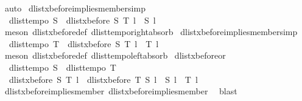 \begin{isabellebody}
\ auto%
\endisatagproof
{\isafoldproof}%
%
\isadelimproof
\isanewline
%
\endisadelimproof
\isanewline
{}\isamarkupfalse%
\ dlist{\isacharunderscore}xbefore{\isacharunderscore}implies{\isacharunderscore}member{}{\isacharbrackleft}simp{\isacharbrackright}{\isacharcolon}\ \isanewline
\ \ {\isachardoublequoteopen}dlist{\isacharunderscore}tempo{}\ S\ {\isasymLongrightarrow}\ dlist{\isacharunderscore}xbefore\ S\ T\ l\ {\isasymLongrightarrow}\ S\ l{\isachardoublequoteclose}\isanewline
%
\isadelimproof
%
\endisadelimproof
%
\isatagproof
{}\isamarkupfalse%
\ {\isacharparenleft}meson\ dlist{\isacharunderscore}xbefore{\isacharunderscore}def\ dlist{\isacharunderscore}tempo{}{\isacharunderscore}right{\isacharunderscore}absorb{\isacharparenright}%
\endisatagproof
{\isafoldproof}%
%
\isadelimproof
\isanewline
%
\endisadelimproof
\isanewline
{}\isamarkupfalse%
\ dlist{\isacharunderscore}xbefore{\isacharunderscore}implies{\isacharunderscore}member{}{\isacharbrackleft}simp{\isacharbrackright}{\isacharcolon}\ \isanewline
\ \ {\isachardoublequoteopen}dlist{\isacharunderscore}tempo{}\ T\ {\isasymLongrightarrow}\ dlist{\isacharunderscore}xbefore\ S\ T\ l\ {\isasymLongrightarrow}\ T\ l{\isachardoublequoteclose}\isanewline
%
\isadelimproof
%
\endisadelimproof
%
\isatagproof
{}\isamarkupfalse%
\ {\isacharparenleft}meson\ dlist{\isacharunderscore}xbefore{\isacharunderscore}def\ dlist{\isacharunderscore}tempo{}{\isacharunderscore}left{\isacharunderscore}absorb{\isacharparenright}%
\endisatagproof
{\isafoldproof}%
%
\isadelimproof
\isanewline
%
\endisadelimproof
\isanewline
{}\isamarkupfalse%
\ dlist{\isacharunderscore}xbefore{\isacharunderscore}or{}{\isacharcolon}\isanewline
\ \ {\isachardoublequoteopen}dlist{\isacharunderscore}tempo{}\ S\ {\isasymLongrightarrow}\ dlist{\isacharunderscore}tempo{}\ T\ {\isasymLongrightarrow}\isanewline
\ \ dlist{\isacharunderscore}xbefore\ S\ T\ l\ {\isasymor}\ dlist{\isacharunderscore}xbefore\ T\ S\ l\ {\isasymLongrightarrow}\ S\ l\ {\isasymand}\ T\ l{\isachardoublequoteclose}\isanewline
%
\isadelimproof
%
\endisadelimproof
%
\isatagproof
{}\isamarkupfalse%
\ dlist{\isacharunderscore}xbefore{\isacharunderscore}implies{\isacharunderscore}member{}\ dlist{\isacharunderscore}xbefore{\isacharunderscore}implies{\isacharunderscore}member{}\ \isamarkupfalse%
\ blast%
\endisatagproof
{\isafoldproof}%
%
\isadelimproof
\isanewline

\end{isabellebody}
